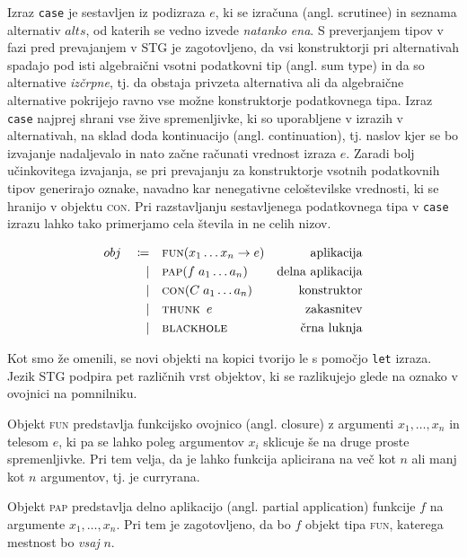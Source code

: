Izraz \texttt{case} je sestavljen iz podizraza $e$, ki se izračuna (angl. scrutinee) in seznama alternativ $alts$, od katerih se vedno izvede \textit{natanko ena}. S preverjanjem tipov v fazi pred prevajanjem v STG je zagotovljeno, da vsi konstruktorji pri alternativah spadajo pod isti algebraični vsotni podatkovni tip (angl. sum type) in da so alternative \textit{izčrpne}, tj. da obstaja privzeta alternativa ali da algebraične alternative pokrijejo ravno vse možne konstruktorje podatkovnega tipa. Izraz \texttt{case} najprej shrani vse žive spremenljivke, ki so uporabljene v izrazih v alternativah, na sklad doda kontinuacijo (angl. continuation), tj. naslov kjer se bo izvajanje nadaljevalo in nato začne računati vrednost izraza $e$. Zaradi bolj učinkovitega izvajanja, se pri prevajanju za konstruktorje vsotnih podatkovnih tipov generirajo oznake, navadno kar nenegativne celoštevilske vrednosti, ki se hranijo v objektu \textsc{con}. Pri razstavljanju sestavljenega podatkovnega tipa v \texttt{case} izrazu lahko tako primerjamo cela števila in ne celih nizov.

\begin{align*}
	obj \quad \coloneq& \quad \textsc{fun}(x_1 \dots x_n \to e) & \text{aplikacija}\\
	\vert& \quad \textsc{pap}(f \; a_1 \dots a_n) & \text{delna aplikacija}\\
	\vert& \quad \textsc{con}(C \; a_1 \dots a_n) & \text{konstruktor}\\
	\vert& \quad \textsc{thunk} \enspace e & \text{zakasnitev}\\
	\vert& \quad \textsc{blackhole} & \text{črna luknja}
\end{align*}

Kot smo že omenili, se novi objekti na kopici tvorijo le s pomočjo \texttt{let} izraza. Jezik STG podpira pet različnih vrst objektov, ki se razlikujejo glede na oznako v ovojnici na pomnilniku.

Objekt \textsc{fun} predstavlja funkcijsko ovojnico (angl. closure) z argumenti $x_1, \dots, x_n$ in telesom $e$, ki pa se lahko poleg argumentov $x_i$ sklicuje še na druge proste spremenljivke. Pri tem velja, da je lahko funkcija aplicirana na več kot $n$ ali manj kot $n$ argumentov, tj. je curryrana.

Objekt \textsc{pap} predstavlja delno aplikacijo (angl. partial application) funkcije $f$ na argumente $x_1, \dots, x_n$. Pri tem je zagotovljeno, da bo $f$ objekt tipa \textsc{fun}, katerega mestnost bo \textit{vsaj} $n$.

